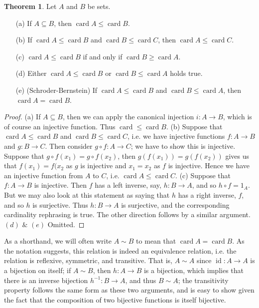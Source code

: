 \documentclass[9pt,reqno]{amsart}
\theoremstyle{definition}
\newtheorem{theorem}{Theorem}[section]
\DeclareMathOperator{\id}{id}
\DeclareMathOperator{\card}{card}
\begin{document}
\begin{theorem}
	Let $A$ and $B$ be sets.
	\begin{itemize}
		\item [(a)] If $A \subseteq B$, then $\card A \leq \card B$.
		\item [(b)] If $\card A \leq \card B$ and $\card B \leq \card C$, then $\card A \leq \card C$.
		\item [(c)] $\card A \leq \card B$ if and only if $\card B \geq \card A$.
		\item [(d)] Either $\card A \leq \card B$ or $\card B \leq \card A$ holds true.
		\item [(e)] (Schroder-Bernstein) If $\card A \leq \card B$ and $\card B \leq \card A$, then $\card A = \card B$.
	\end{itemize}
\end{theorem}
\begin{proof}(a) If $A \subseteq B$, then we can apply the canonical injection $i \colon A \to B$, which is of course an injective function. Thus $\card \leq \card B$. (b) Suppose that $\card A \leq \card B$ and $\card B \leq \card C$, i.e. we have injective functions $f \colon A \to B$ and $g \colon B \to C$. Then consider $g\circ f \colon A \to C$; we have to show this is injective. Suppose that $g \circ f (x_1) = g \circ f(x_2)$, then $g(f(x_1)) = g(f(x_2))$ gives us that $f(x_1) = f(x_2$ as $g$ is injective and $x_1 = x_2$ as $f$ is injective. Hence we have an injective function from $A$ to $C$, i.e. $\card A \leq \card C$. (c) Suppose that $f \colon A \to B$ is injective. Then $f$ has a left inverse, say, $h \colon B \to A$, and so $h \circ f = 1_A$. But we may also look at this statement as saying that $h$ has a right inverse, $f$, and so $h$ is surjective. Thus $h \colon B \to A$ is surjective, and the corresponding cardinality rephrasing is true. The other direction follows by a similar argument. $(d)$ $\&$ $(e)$ Omitted.
\end{proof}
As a shorthand, we will often write $A \sim B$ to mean that $\card A = \card B$. As the notation suggests, this relation is indeed an equivalence relation, i.e. the relation is reflexive, symmetric, and transitive. That is, $A \sim A$ since $\id \colon A \to A$ is a bijection on itself; if $A \sim B$, then $h \colon A \to B$ is a bijection, which implies that there is an inverse bijection $h^{-1} \colon B \to A$, and thus $B \sim A$; the transitivity property follows the same form as these two arguments, and is easy to show given the fact that the composition of two bijective functions is itself bijective. 
\end{document}
